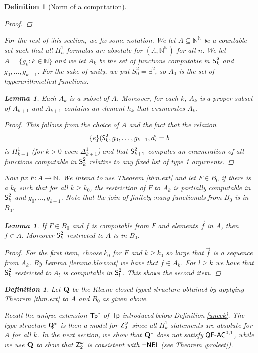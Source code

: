\documentclass[reqno]{amsart}
\newtheorem{defi}[thm]{Definition}
\newtheorem{lemma}[thm]{Lemma}
\newtheorem{definition}[thm]{Definition}
\def\Z{\textup{\textsf{Z}}}
\def\N{{\mathbb  N}}
\def\QFAC{\textup{\textsf{QF-AC}}}
\def\TP{\textup{\textsf{Tp}}}
\def\NBI{\textup{\textsf{NBI}}}
\def\SS{\textup{\textsf{S}}}
\numberwithin{equation}{section}
\numberwithin{thm}{section}
\begin{document}
\begin{defi}[Norm of a computation]
\begin{proof}
 \end{proof} 
For the rest of this section, we fix some notation. We let $A \subseteq \N^\N$ be a countable set such that all $\Pi^1_n$ formulas are absolute for $(A, \N^\N) $ for all $n$. We let $A = \{g_k : k \in \N\}$ and we let $A_k$ be the set of functions computable in $\SS^{2}_k$ and $g_0 , \ldots , g_{k-1}$. For the sake of unity, we put $S^2_0 = \exists^2$, so $A_0$ is the set of hyperarithmetical functions.
 \begin{lemma} Each $A_k$ is a subset of $A$. Moreover, 
 for each $k$, $A_k$ is a proper subset of $A_{k+1}$ and $A_{k+1}$ contains an element $h_k$ that enumerates $A_k$.\end{lemma}
 \begin{proof} This follows from the choice of $A$ and the fact that the relation \[\{e\}(\SS^{2}_{k} , g_0 , \ldots , g_{k-1}, \vec a) = b\] is $\Pi^1_{k+1}$ (for $k > 0$ even $\Delta^1_{k+1}$) and that $\SS^2_{k+1}$ computes an enumeration of all functions computable in $\SS^2_k$ relative to any fixed list of type 1 arguments.  %
 \end{proof}
Now fix $F:A \rightarrow \N$. We intend to use Theorem \ref{thm.ext} and let $F \in B_{0}$ if there is a $k_0$ such that for all $k \geq k_0$, the restriction of $F$ to $A_k$ is partially computable in $\SS^{2}_k$ and $g_0 , \ldots , g_{k-1}$. 
Note that the join of finitely many functionals from $B_{0}$ is in $B_{0}$.
\begin{lemma} 
If $F \in B_{0}$ and $f$ is computable from $F$ and elements $\vec f$ in $A$, then $f \in A$. Moreover $\SS^2_k$ restricted to $A$ is in $B_{0}$.
\end{lemma}
\begin{proof} 
For the first item, choose $k_0$ for $F$ and $k \geq k_0$ so large that $\vec f$ is a sequence from $A_k$. 
By Lemma \ref{lemma.blowout} we have that $f \in A_k$. For $l \geq k$ we have that $\SS^2_k$ restricted to $A_l$ is computable in $\SS^2_l$. 
This shows the second item.
\end{proof}
\begin{definition}\label{defQ}
{\em Let $\bf Q$ be the Kleene closed typed structure obtained by applying Theorem \ref{thm.ext} to $A$ and $B_{0}$ as given above.}
\end{definition}
Recall the unique extension $\TP^{*}$ of $\TP$ introduced below Definition \ref{uneek}.
The type structure ${\bf Q}^*$ is then a model for $\Z_2^\omega$ since all $\Pi^1_k$-statements are absolute for $A$ for all $k$. 
In the next section, we show that ${\bf Q}^*$ does not satisfy $\QFAC^{0,1}$, while we use $\bf Q$ to show that $\Z_2^\omega$ is consistent with $\neg\NBI$ (see Theorem \ref{proleet}).


\end{defi}
\end{document}
